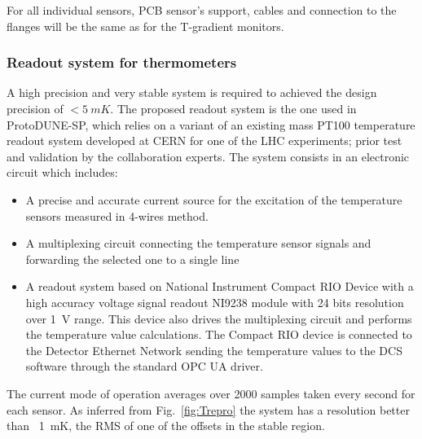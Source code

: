 For all individual sensors, PCB sensor's support, cables and connection to the flanges will be the same as for the T-gradient monitors. 
  



\subsubsection{Readout system for thermometers}
\label{sec:fdgen-slow-cryo-therm-readout}

A high precision and very stable system is required to achieved the design precision of $< \SI{5}{mK}$.
The proposed readout system is the one used in ProtoDUNE-SP, which relies on a variant of an existing mass PT100 temperature readout system developed at
CERN for one of the LHC experiments; prior  test and validation by the collaboration experts. The system consists in an electronic circuit which includes:
\begin{itemize}
\item A precise and accurate current source for the excitation of the temperature sensors measured in 4-wires method. 
\item A multiplexing circuit connecting the temperature sensor signals and forwarding the selected one to a single line
\item A readout system based on National Instrument Compact RIO Device  with a high accuracy voltage signal readout NI9238 module with 24 bits resolution over \SI{1}{V} range. This device also drives the multiplexing circuit and performs the temperature value calculations. The Compact RIO device is connected to the Detector Ethernet Network sending the temperature values to the DCS software through the standard OPC UA driver.

\end{itemize}

The current mode of operation averages over 2000 samples taken every second for each sensor. 
As inferred from Fig.~\ref{fig:Trepro} the system has a resolution better than \
\SI{1}{mK}, the RMS of one of the offsets in the stable region.



